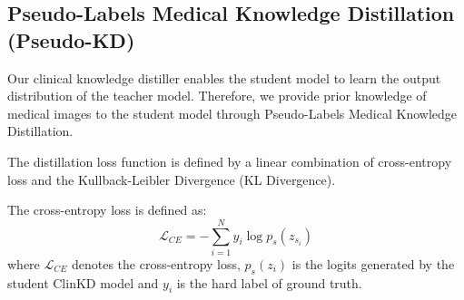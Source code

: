 \subsection{Pseudo-Labels Medical Knowledge Distillation (Pseudo-KD)}

Our clinical knowledge distiller enables the student model to learn the output distribution of the teacher model. Therefore, we provide prior knowledge of medical images to the student model through Pseudo-Labels Medical Knowledge Distillation.

The distillation loss function is defined by a linear combination of cross-entropy loss and the Kullback-Leibler Divergence (KL Divergence). 

The cross-entropy loss is defined as:
\begin{equation}
    \mathcal{L}_{CE} = -\sum_{i=1}^Ny_i\log p_s(z_{s_i})
\end{equation}
where $\mathcal{L}_{CE}$ denotes the cross-entropy loss, $p_s(z_i)$ is the logits generated by the student ClinKD model and $y_i$ is the hard label of ground truth.

